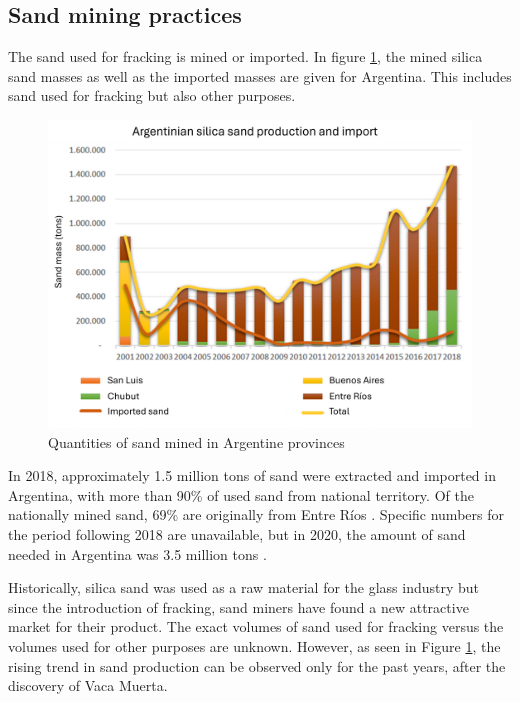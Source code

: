 \subsection{Sand mining practices}
The sand used for fracking is mined or imported. In figure \ref{fig:sanddiagram}, the mined silica sand masses as well as the imported masses are given for Argentina. This includes sand used for fracking but also other purposes.

\begin{figure}[H]
    \centering
    \includegraphics[width=1\linewidth]{figures/ch9/Sandgraphquantities.png}
    \caption{Quantities of sand mined in Argentine provinces \autocite{secretariadepoliticamineraArenasParaFracking2019}}
    \label{fig:sanddiagram}
\end{figure}

In 2018, approximately 1.5 million tons of sand were extracted and imported in Argentina, with more than 90\% of used sand from national territory. Of the nationally mined sand, 69\% are originally from Entre Ríos \autocite{secretariadepoliticamineraArenasParaFracking2019}. Specific numbers for the period following 2018 are unavailable, but in 2020, the amount of sand needed in Argentina was 3.5 million tons \autocite{novasImpactoAmbientalOculto2022}.

Historically, silica sand was used as a raw material for the glass industry but since the introduction of fracking, sand miners have found a new attractive market for their product. The exact volumes of sand used for fracking versus the volumes used for other purposes are unknown. However, as seen in Figure \ref{fig:sanddiagram}, the rising trend in sand production can be observed only for the past years, after the discovery of Vaca Muerta.

